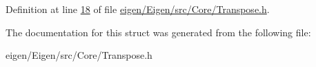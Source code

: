 Definition at line \hyperlink{eigen_2_eigen_2src_2_core_2_transpose_8h_source_l00018}{18} of file \hyperlink{eigen_2_eigen_2src_2_core_2_transpose_8h_source}{eigen/\+Eigen/src/\+Core/\+Transpose.\+h}.



The documentation for this struct was generated from the following file\+:\begin{DoxyCompactItemize}
\item 
eigen/\+Eigen/src/\+Core/\+Transpose.\+h\end{DoxyCompactItemize}
